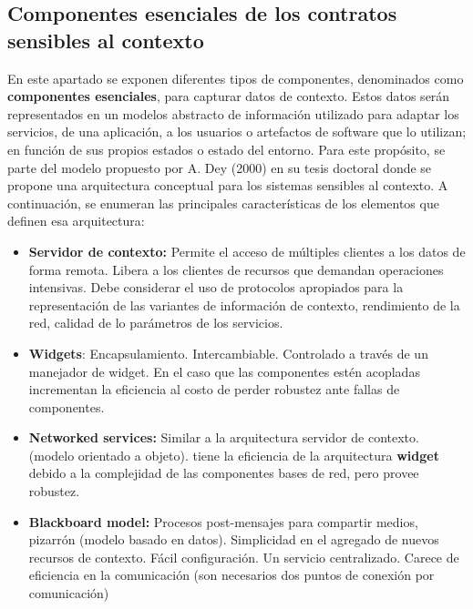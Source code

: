 {\subsection{Componentes esenciales de los contratos sensibles al contexto}

En este apartado se exponen diferentes tipos de componentes, denominados como \textbf{componentes esenciales}, para capturar datos de contexto. Estos datos serán representados en un modelos abstracto de información  utilizado para adaptar los servicios, de una aplicación, a los usuarios o artefactos de software que lo utilizan; en función de sus propios estados o estado del entorno. Para este propósito, se parte del modelo propuesto por A. Dey (2000) en su tesis doctoral \cite{Dey} donde se propone una arquitectura conceptual para los sistemas sensibles  al contexto. A continuación, se enumeran las principales características de los elementos que definen esa arquitectura:


\begin{itemize}

\item \textbf {Servidor de contexto:} Permite el acceso de múltiples
clientes a los datos de forma remota.  Libera a los clientes de
recursos que demandan operaciones intensivas.  Debe considerar el uso
de protocolos apropiados para la representación de las variantes de información de contexto, rendimiento de la red, calidad de lo parámetros de los servicios.


\item \textbf{Widgets}:  Encapsulamiento.  Intercambiable.
Controlado a través de un manejador de widget. En el caso que las
componentes estén acopladas incrementan la eficiencia al costo de perder robustez ante fallas de componentes.


\item \textbf{Networked services:}  Similar a la arquitectura
servidor de contexto. (modelo orientado a objeto).  tiene la eficiencia de la arquitectura \textbf{widget} debido a la complejidad de las componentes bases de red, pero provee robustez.


\item \textbf{Blackboard model:}  Procesos post-mensajes para
compartir medios, pizarrón (modelo basado en datos). Simplicidad en el agregado de nuevos recursos de contexto.  Fácil configuración.  Un servicio centralizado.  Carece de eficiencia en la comunicación (son
necesarios dos puntos de conexión por comunicación)

\end{itemize}

}
